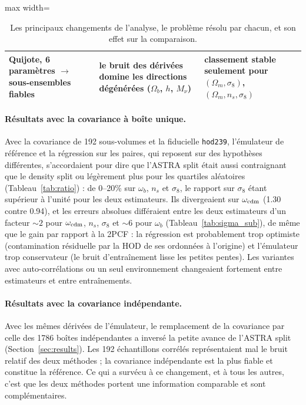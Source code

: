 \begin{table}[!tp]
\begin{adjustbox}{max width=\textwidth}
\begin{tabular}{p{4.2cm}p{6.3cm}p{6.3cm}}
Quijote, 6 paramètres $\to$ sous-ensembles fiables & le bruit des dérivées domine les directions dégénérées ($\Omega_b$, $h$, $M_\nu$) & classement stable seulement pour $(\Omega_m,\sigma_8)$, $(\Omega_m,n_s,\sigma_8)$ \\
\bottomrule
\end{tabular}
\end{adjustbox}
\caption{Les principaux changements de l'analyse, le problème résolu par chacun, et son effet sur la comparaison.}
\label{tab:evolution}
\end{table}

\paragraph{Résultats avec la covariance à boîte unique.} Avec la covariance de 192 sous-volumes et la fiducielle \texttt{hod239}, l'émulateur de référence et la régression sur les paires, qui reposent sur des hypothèses différentes, s'accordaient pour dire que l'ASTRA split était aussi contraignant que le density split ou légèrement plus pour les quartiles aléatoires (Tableau~\ref{tab:ratio}) : de 0--20\% sur $\omega_b$, $n_s$ et $\sigma_8$, le rapport sur $\sigma_8$ étant supérieur à l'unité pour les deux estimateurs. Ils divergeaient sur $\omega_{\rm cdm}$ (1.30 contre 0.94), et les erreurs absolues différaient entre les deux estimateurs d'un facteur $\sim2$ pour $\omega_{\rm cdm}$, $n_s$, $\sigma_8$ et $\sim6$ pour $\omega_b$ (Tableau~\ref{tab:sigma_sub}), de même que le gain par rapport à la 2PCF : la régression est probablement trop optimiste (contamination résiduelle par la HOD de ses ordonnées à l'origine) et l'émulateur trop conservateur (le bruit d'entraînement lisse les petites pentes). Les variantes avec auto-corrélations ou un seul environnement changeaient fortement entre estimateurs et entre entraînements.

\paragraph{Résultats avec la covariance indépendante.} Avec les mêmes dérivées de l'émulateur, le remplacement de la covariance par celle des 1786 boîtes indépendantes a inversé la petite avance de l'ASTRA split (Section~\ref{sec:results}). Les 192 échantillons corrélés représentaient mal le bruit relatif des deux méthodes ; la covariance indépendante est la plus fiable et constitue la référence. Ce qui a survécu à ce changement, et à tous les autres, c'est que les deux méthodes portent une information comparable et sont complémentaires.

